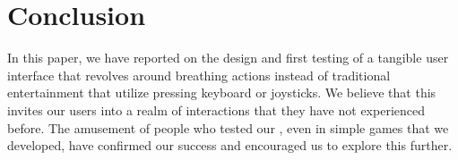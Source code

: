 \section{Conclusion}\label{sec:conc}

In this paper, we have reported on the design and first testing of a tangible user interface that revolves around breathing actions instead of traditional entertainment that utilize pressing keyboard or joysticks. We believe that this invites our users into a realm of interactions that they have not experienced before. The amusement of people who tested our \tube, even in simple games that we developed, have confirmed our success and encouraged us to explore this further.
